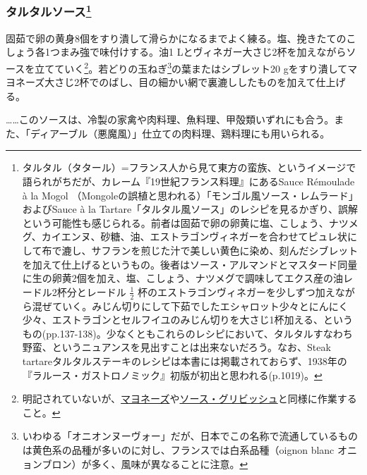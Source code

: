 \begin{recette}
\atoaki{}

\hypertarget{sauce-tartare}{%
\subsubsection[タルタルソース]{\texorpdfstring{タルタルソース\footnote{タルタル（タタール）=フランス人から見て東方の蛮族、というイメージで語られがちだが、カレーム『19世紀フランス料理』にあるSauce
  Rémoulade à la Mogol
  （Mongoleの誤植と思われる）「モンゴル風ソース・レムラード」およびSauce
  à la
  Tartare「タルタル風ソース」のレシピを見るかぎり、誤解という可能性も感じられる。前者は固茹で卵の卵黄に塩、こしょう、ナツメグ、カイエンヌ、砂糖、油、エストラゴンヴィネガーを合わせてピュレ状にして布で漉し、サフランを煎じた汁で美しい黄色に染め、刻んだシブレットを加えて仕上げるというもの。後者はソース・アルマンドとマスタード同量に生の卵黄2個を加え、塩、こしょう、ナツメグで調味してエクス産の油レードル2杯分とレードル
  \(\frac{1}{2}\)
  杯のエストラゴンヴィネガーを少しずつ加えながら混ぜていく。みじん切りにして下茹でしたエシャロット少々とにんにく少々、エストラゴンとセルフイユのみじん切りを大さじ1杯加える、というもの(pp.137-138)。少なくともこれらのレシピにおいて、タルタルすなわち野蛮、というニュアンスを見出すことは出来ないだろう。なお、Steak
  tartareタルタルステーキのレシピは本書には掲載されておらず、1938年の『ラルース・ガストロノミック』初版が初出と思われる(p.1019)。}}{タルタルソース}}\label{sauce-tartare}}


 

固茹で卵の黄身8個をすり潰して滑らかになるまでよく練る。塩、挽きたてのこしょう各1つまみ強で味付けする。油1
Lとヴィネガー大さじ2杯を加えながらソースを立てていく\footnote{明記されていないが、\protect\hyperlink{mayonnaise}{マヨネーズ}や\protect\hyperlink{sauce-gribiche}{ソース・グリビッシュ}と同様に作業すること。}。若どりの玉ねぎ\footnote{いわゆる「オニオンヌーヴォー」だが、日本でこの名称で流通しているものは黄色系の品種が多いのに対し、フランスでは白系品種（oignon
  blanc オニョンブロン）が多く、風味が異なることに注意。}の葉またはシブレット20
gをすり潰してマヨネーズ大さじ2杯でのばし、目の細かい網で裏漉ししたものを加えて仕上げる。

\ldots{}\ldots{}このソースは、冷製の家禽や肉料理、魚料理、甲殻類いずれにも合う。また、「ディアーブル（悪魔風）」仕立ての肉料理、鶏料理にも用いられる。


\end{recette}
